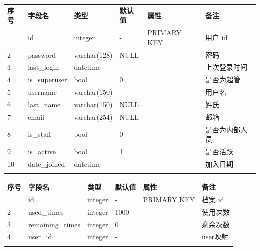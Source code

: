 \documentclass{morningstar}
\begin{document}
\begin{table}[ht]
    \centering
    \begin{tabular}{p{1cm}p{2.5cm}p{2cm}p{2cm}p{3cm}p{2.7cm}}
    \thickhline
    \textbf{序号} & \textbf{字段名}         & \textbf{类型}  & \textbf{默认值}   & \textbf{属性}          & \textbf{备注} \\
    \thickhline
    1            & id                     & integer      & -              & PRIMARY KEY & 用户 id       \\
    2            & password               & varchar(128) & NULL           &             & 密码       \\
    3            & last\_login            & datetime     & -              &             & 上次登录时间        \\
    4            & is\_superuser          & bool         & 0              &             & 是否为超管        \\
    5            & username               & varchar(150) & -              &             & 用户名        \\
    6            & last\_name             & varchar(150) & NULL           &             & 姓氏        \\
    7            & email                  & varchar(254) & NULL           &             & 邮箱        \\
    8            & is\_staff              & bool         & 0              &             & 是否为内部人员        \\
    9            & is\_active             & bool         & 1              &             & 是否活跃        \\
    10           & date\_joined           & datetime     & -              &             & 加入日期        \\
    \thickhline
    \end{tabular}
\end{table}

\begin{table}[ht]
    \centering
    \begin{tabular}{p{1cm}p{2.5cm}p{2cm}p{2.5cm}p{3cm}p{2.3cm}}
    \thickhline
    \textbf{序号} & \textbf{字段名}         & \textbf{类型}  & \textbf{默认值}   & \textbf{属性}          & \textbf{备注} \\
    \thickhline
    1            & id                     & integer      & -              & PRIMARY KEY & 档案 id       \\
    2            & used\_times            & integer      & 1000           &             & 使用次数        \\
    3            & remaining\_times       & integer      & 0              &             & 剩余次数        \\
    4            & user\_id               & integer      & -              &             & user映射       \\
    \thickhline
    \end{tabular}
\end{table}
\end{document}
